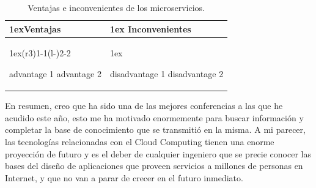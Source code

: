 \begin{table}
\begin{tabularx}{\linewidth}{>{\parskip1ex}X@{\kern4\tabcolsep}>{\parskip1ex}X}
\toprule
\hfil\bfseries Ventajas
&
\hfil\bfseries Inconvenientes
\\\cmidrule(r{3\tabcolsep}){1-1}\cmidrule(l{-\tabcolsep}){2-2}

\begin{itemize}
	\pro advantage 1
	\pro advantage 2

\end{itemize}
&
\begin{itemize}
	\con disadvantage 1
	\con disadvantage 2
\end{itemize}

\\\bottomrule
\end{tabularx}
\caption{Ventajas e inconvenientes de los microservicios.}
\end{table}

En resumen, creo que ha sido una de las mejores conferencias a las que he acudido este año, esto me ha motivado enormemente para buscar información y completar la base de conocimiento que se transmitió en la misma. A mi parecer, las tecnologías relacionadas con el Cloud Computing tienen una enorme proyección de futuro y es el deber de cualquier ingeniero que se precie conocer las bases del diseño de aplicaciones que proveen servicios a millones de personas en Internet, y que no van a parar de crecer en el futuro inmediato. 

